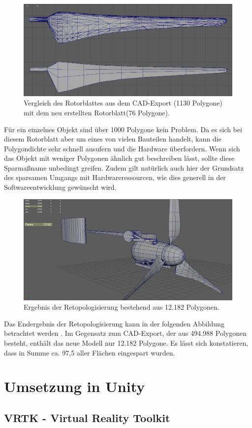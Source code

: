 \begin{figure}[H]
	\centering
	\captionsetup{width=1\textwidth}
	\includegraphics[keepaspectratio, width=1\textwidth]{bildquellen/rotorblattGeo}
	\caption{Vergleich des Rotorblattes aus dem CAD-Export (1130 Polygone) mit dem neu erstellten Rotorblatt(76 Polygone).}
	\label{fig:2.6}
\end{figure}

Für ein einzelnes Objekt sind über 1000 Polygone kein Problem. Da es sich bei diesem Rotorblatt aber um eines von vielen Bauteilen handelt, kann die Polygondichte sehr schnell ausufern und die Hardware überfordern. Wenn sich das Objekt mit weniger Polygonen ähnlich gut beschreiben lässt, sollte diese Sparmaßname unbedingt greifen. Zudem gilt natürlich auch hier der Grundsatz des sparsamen Umgangs mit Hardwareressourcen, wie dies generell in der Softwareentwicklung gewünscht wird.  

\begin{figure}[H]
	\centering
	\captionsetup{width=1\textwidth}
	\includegraphics[keepaspectratio, width=1\textwidth]{bildquellen/WEA-Vergleich2}
	\caption{Ergebnis der Retopologisierung bestehend aus 12.182 Polygonen.}
	\label{fig:2.7}
\end{figure}

Das Endergebnis der Retopologisierung kann in der folgenden Abbildung betrachtet werden  . Im Gegensatz zum CAD-Export, der aus 494.988 Polygonen besteht, enthält das neue Modell nur 12.182 Polygone. Es lässt sich konstatieren, dass in Summe ca. 97,5 aller Flächen eingespart wurden.


\section{Umsetzung in Unity}
\label{sec:UmsetzungInUnity}

\subsection{VRTK - Virtual Reality Toolkit}
\label{subsec:VRTK-VirtualRealityToolkit}